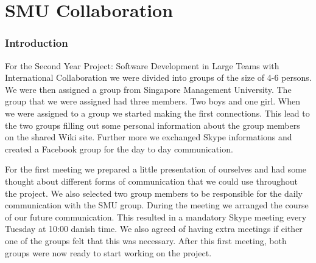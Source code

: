 \part{SMU Collaboration}
\section{Introduction}
For the Second Year Project: Software Development in Large Teams with International Collaboration we were divided into groups of the size of
4-6 persons. We were then assigned a group from Singapore Management University. The group that we were assigned had three members. Two boys and one girl.
When we were assigned to a group we started making the first connections. This lead to the two groups filling out some personal information about
the group members on the shared Wiki site. Further more we exchanged Skype informations and created a Facebook group for the day to day communication.

For the first meeting we prepared a little presentation of ourselves and had some thought about different forms of communication that we could use
throughout the project. We also selected two group members to be responsible for the daily communication with the SMU group. 
During the meeting we arranged the course of our future communication. This resulted in a mandatory Skype meeting every Tuesday at 10:00 danish time.
We also agreed of having extra meetings if either one of the groups felt that this was necessary. After this first meeting, both groups were now ready
to start working on the project.

